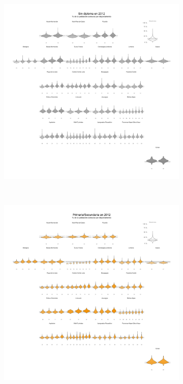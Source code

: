 \begin{figure}[h]
\begin{subfigure}{0.3\textwidth}
	\includegraphics[width = \textwidth]{Figs/AED/Geofacet_Distr_por_Dpto_Dip1_2012}
	\end{subfigure}\\
	\begin{subfigure}{0.3\textwidth}
	\includegraphics[width = \textwidth]{Figs/AED/Geofacet_Distr_por_Dpto_Dip2_2012}

\end{subfigure}
\end{figure}
